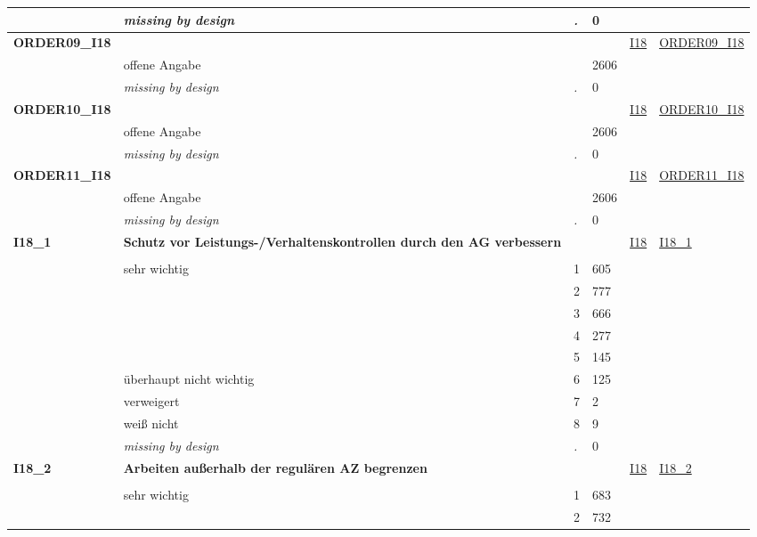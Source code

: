 \begin{longtable}{| L{2.45cm} | L{6cm} | C{1.5cm} | R{1cm} | C{2.25cm} | C{2.25cm} |}
   & \textit{missing by design} & \textit{.} & 0 &  &  \\ 
   \midrule
\textbf{ORDER09\_I18}\label{var:ORDER09:I18} & \textbf{} &  &  & \hyperref[I18]{I18} & \hyperref[var:suf:ORDER09:I18]{ORDER09\_I18} \\ 
   & offene Angabe &  & 2606 &  &  \\ 
   & \textit{missing by design} & \textit{.} & 0 &  &  \\ 
   \midrule
\textbf{ORDER10\_I18}\label{var:ORDER10:I18} & \textbf{} &  &  & \hyperref[I18]{I18} & \hyperref[var:suf:ORDER10:I18]{ORDER10\_I18} \\ 
   & offene Angabe &  & 2606 &  &  \\ 
   & \textit{missing by design} & \textit{.} & 0 &  &  \\ 
   \midrule
\textbf{ORDER11\_I18}\label{var:ORDER11:I18} & \textbf{} &  &  & \hyperref[I18]{I18} & \hyperref[var:suf:ORDER11:I18]{ORDER11\_I18} \\ 
   & offene Angabe &  & 2606 &  &  \\ 
   & \textit{missing by design} & \textit{.} & 0 &  &  \\ 
   \midrule
\textbf{I18\_1}\label{var:I18:1} & \textbf{Schutz vor Leistungs-/Verhaltenskontrollen durch den AG verbessern} &  &  & \hyperref[I18]{I18} & \hyperref[var:suf:I18:1]{I18\_1} \\ 
   &  &  &  &  &  \\ 
   & sehr wichtig & 1 & 605 &  &  \\ 
   &  & 2 & 777 &  &  \\ 
   &  & 3 & 666 &  &  \\ 
   &  & 4 & 277 &  &  \\ 
   &  & 5 & 145 &  &  \\ 
   & überhaupt nicht wichtig & 6 & 125 &  &  \\ 
   & verweigert & 7 & 2 &  &  \\ 
   & weiß nicht & 8 & 9 &  &  \\ 
   & \textit{missing by design} & \textit{.} & 0 &  &  \\ 
   \midrule
\textbf{I18\_2}\label{var:I18:2} & \textbf{Arbeiten außerhalb der regulären AZ begrenzen} &  &  & \hyperref[I18]{I18} & \hyperref[var:suf:I18:2]{I18\_2} \\ 
   &  &  &  &  &  \\ 
   & sehr wichtig & 1 & 683 &  &  \\ 
   &  & 2 & 732 &  &  \\ 

\end{longtable}
